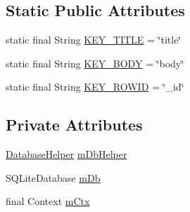 \subsection*{\-Static \-Public \-Attributes}
\begin{DoxyCompactItemize}
\item 
static final \-String \hyperlink{classsrdes_1_1menupp_1_1_entree_db_adapter_a80814d8e801bcacf10fe88435b016c1b}{\-K\-E\-Y\-\_\-\-T\-I\-T\-L\-E} = \char`\"{}title\char`\"{}
\item 
static final \-String \hyperlink{classsrdes_1_1menupp_1_1_entree_db_adapter_a9d450de6b265b9dede4f14d5db1d89ad}{\-K\-E\-Y\-\_\-\-B\-O\-D\-Y} = \char`\"{}body\char`\"{}
\item 
static final \-String \hyperlink{classsrdes_1_1menupp_1_1_entree_db_adapter_aa16f0ed7fcfc8fd82d41a372633dfe41}{\-K\-E\-Y\-\_\-\-R\-O\-W\-I\-D} = \char`\"{}\-\_\-id\char`\"{}
\end{DoxyCompactItemize}
\subsection*{\-Private \-Attributes}
\begin{DoxyCompactItemize}
\item 
\hyperlink{classsrdes_1_1menupp_1_1_entree_db_adapter_1_1_database_helper}{\-Database\-Helper} \hyperlink{classsrdes_1_1menupp_1_1_entree_db_adapter_a43c5b7fb87b489c57b21247e15a6bc64}{m\-Db\-Helper}
\item 
\-S\-Q\-Lite\-Database \hyperlink{classsrdes_1_1menupp_1_1_entree_db_adapter_a272749736721c68b9f62bce3f2670290}{m\-Db}
\item 
final \-Context \hyperlink{classsrdes_1_1menupp_1_1_entree_db_adapter_a3c238912801a1f041c8c148d4c7fac3d}{m\-Ctx}
\end{DoxyCompactItemize}
